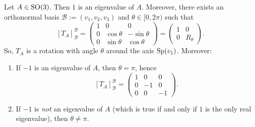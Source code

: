 \begin{proposition}
\label{prop:classification_so3}
Let $A \in \operatorname{SO}(3)$. Then $1$ is an eigenvalue of $A$. 
Moreover, there exists an orthonormal basis $\mathcal{B} := (v_1, v_2, v_3)$ and $\theta \in [0, 2\pi)$ such that
\[ [T_A]_{\mathcal{B}}^{\mathcal{B}} = \begin{pmatrix} 1 & 0 & 0 \\ 0 & \cos\theta & -\sin\theta \\ 0 & \sin\theta & \cos\theta \end{pmatrix} = \begin{pmatrix} 1 & 0 \\ 0 & R_\theta \end{pmatrix}. \]
So, $T_A$ is a rotation with angle $\theta$ around the axis $\operatorname{Sp}(v_1)$. Moreover:
\begin{enumerate}
    \item If $-1$ is an eigenvalue of $A$, then $\theta = \pi$, hence
    \[ [T_A]_{\mathcal{B}}^{\mathcal{B}} = \begin{pmatrix} 1 & 0 & 0 \\ 0 & -1 & 0 \\ 0 & 0 & -1 \end{pmatrix}. \]
    \item If $-1$ is \emph{not} an eigenvalue of $A$ (which is true if and only if $1$ is the only real eigenvalue), then $\theta \neq \pi$.
\end{enumerate}
\end{proposition}

\begin{center}
\end{center}


